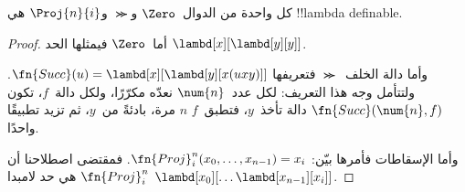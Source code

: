 \documentclass[../../../include/open-logic-section]{subfiles}
\begin{document}

\begin{lem}
كل واحدة من الدوال~$\Zero$ و$\Succ$ و$\Proj{n}{i}$ هي !!{lambda definable}.
\end{lem}

\begin{proof}
أما~$\Zero$ فيمثلها الحد
$\lambd[x][\lambd[y][y]]$.

وأما دالة الخلف~$\Succ$ فتعريفها
$\fn{Succ}(u) = \lambd[x][\lambd[y][x(uxy)]]$. ولتتأمل وجه هذا التعريف:
لكل عدد~$\num{n}$ نعدّه مكرّرًا، ولكل دالة~$f$، تكون
$\fn{Succ}(\num{n},f)$ دالة تأخذ~$y$، فتطبق~$f$
$n$ مرة، بادئةً من~$y$، ثم تزيد تطبيقًا واحدًا.

وأما الإسقاطات فأمرها بيّن:
$\fn{Proj}^n_i(x_0, \dots, x_{n-1}) = x_i$. فمقتضى اصطلاحنا أن
$\fn{Proj}^n_i$ هي حد لامبدا
$\lambd[x_0][\dots \lambd[x_{n-1}][x_i]]$.
\end{proof}
\end{document}

